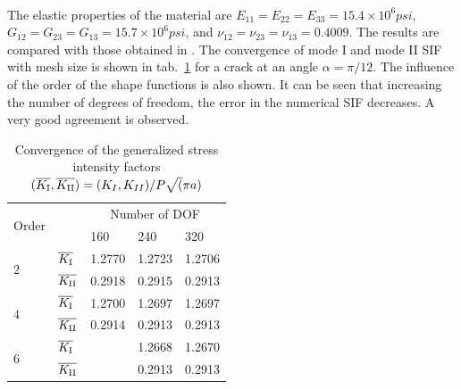 \paragraph{}
The elastic properties of the material are $E_{11} = E_{22}= E_{33}=15.4\times 10^6 psi$, $G_{12} = G_{23} = G_{13} = 15.7 \times 10^6 psi$, and $\nu_{12} = \nu_{23} = \nu_{13} = 0.4009$.
The results are compared with those obtained in \cite{Banks2005}.
The convergence of mode I and mode II SIF with mesh size is shown in tab.~\ref{iso_tab:angled_crack_convergence} for a crack at an angle $\alpha = \pi/12$.
The influence of the order of the shape functions is also shown.
It can be seen that increasing the number of degrees of freedom, the error in the numerical SIF decreases.
A very good agreement is observed.
\begin{table}
\caption{Convergence of the generalized stress intensity factors $
    (\mean{K_\RN{1}}, \mean{K_\RN{2}}) =
    (K_I,K_{II}) /
    P\sqrt(\pi a)
    $}
\label{iso_tab:angled_crack_convergence}
\begin{tabularx}{\textwidth}{XXXXX}
    \toprule
    \multirow{2}{*}{Order}& & \multicolumn{3}{c}{Number of DOF} \\
    \cmidrule{3-5}
    & & 160 & 240 & 320 \\
    \multirow{2}{*}{$2$}    &   $\mean{K_\RN{1}}$   &   1.2770  &   1.2723  &   1.2706  \\
                            &   $\mean{K_\RN{2}}$   &   0.2918  &   0.2915  &   0.2913  \\
    \multirow{2}{*}{$4$}    &   $\mean{K_\RN{1}}$   &   1.2700  &   1.2697  &   1.2697  \\
                            &   $\mean{K_\RN{2}}$   &   0.2914  &   0.2913  &   0.2913  \\
    \multirow{2}{*}{$6$}    &   $\mean{K_\RN{1}}$   &           &   1.2668  &   1.2670  \\
                            &   $\mean{K_\RN{2}}$   &           &   0.2913  &   0.2913  \\                           
    \midrule
    \bottomrule
\end{tabularx}
\end{table}

